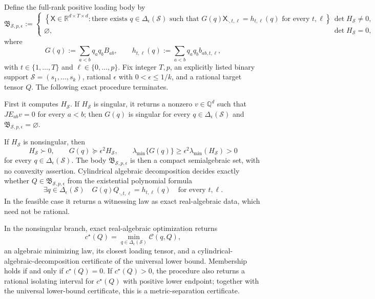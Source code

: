 Define the full-rank positive loading body by
\[
 \mathfrak B_{\mathcal S,p,\epsilon}
 :=
 \begin{cases}
 \left\{\mathsf X\in\mathbb R^{d\times T\times d}:
 \text{there exists }q\in\Delta_{\epsilon}(\mathcal S)
 \text{ such that }
 G(q)\mathsf X_{\cdot,t,\ell}=h_{t,\ell}(q)
 \text{ for every }t,\ell\right\},
 & \det H_{\mathcal S}\neq0,\\[6pt]
 \varnothing,
 & \det H_{\mathcal S}=0,
 \end{cases}
\]
where
\[
 G(q):=\sum_{a<b}q_aq_bB_{ab},
 \qquad
 h_{t,\ell}(q):=\sum_{a<b}q_aq_bb_{ab,t,\ell},
\]
with \(t\in\{1,\ldots,T\}\) and \(\ell\in\{0,\ldots,p\}\).
Fix integer \(T,p\), an explicitly listed binary support \(\mathcal S=(s_1,\ldots,s_k)\), rational \(\epsilon\) with \(0<\epsilon\leq1/k\), and a rational target tensor \(Q\).  The following exact procedure terminates.

First it computes \(H_{\mathcal S}\).  If \(H_{\mathcal S}\) is singular, it returns a nonzero \(v\in\mathbb Q^d\) such that \(JE_{ab}v=0\) for every \(a<b\); then \(G(q)\) is singular for every \(q\in\Delta_{\epsilon}(\mathcal S)\) and \(\mathfrak B_{\mathcal S,p,\epsilon}=\varnothing\).

If \(H_{\mathcal S}\) is nonsingular, then
\[
 H_{\mathcal S}\succ0,
 \qquad
 G(q)\succeq\epsilon^2H_{\mathcal S},
 \qquad
 \lambda_{\min}\{G(q)\}\geq
 \epsilon^2\lambda_{\min}(H_{\mathcal S})>0
\]
for every \(q\in\Delta_{\epsilon}(\mathcal S)\).  The body \(\mathfrak B_{\mathcal S,p,\epsilon}\) is then a compact semialgebraic set, with no convexity assertion.  Cylindrical algebraic decomposition decides exactly whether \(Q\in\mathfrak B_{\mathcal S,p,\epsilon}\) from the existential polynomial formula
\[
 \exists q\in\Delta_{\epsilon}(\mathcal S)\quad
 G(q)Q_{\cdot,t,\ell}=h_{t,\ell}(q)
 \quad\text{for every }t,\ell.
\]
In the feasible case it returns a witnessing law as exact real-algebraic data, which need not be rational.

In the nonsingular branch, exact real-algebraic optimization returns
\[
 c^{\star}(Q)=\min_{q\in\Delta_{\epsilon}(\mathcal S)}\mathcal C(q,Q),
\]
an algebraic minimizing law, its closest loading tensor, and a cylindrical-algebraic-decomposition certificate of the universal lower bound.  Membership holds if and only if \(c^{\star}(Q)=0\).  If \(c^{\star}(Q)>0\), the procedure also returns a rational isolating interval for \(c^{\star}(Q)\) with positive lower endpoint; together with the universal lower-bound certificate, this is a metric-separation certificate.

